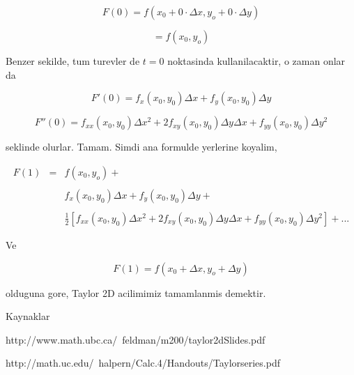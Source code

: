 \documentclass[12pt,fleqn]{article}\usepackage{../common}
\begin{document}
\[ F(0) = f(x_0 + 0 \cdot \Delta x, y_o + 0 \cdot \Delta y) \]

\[ = f(x_0 , y_o) \]

Benzer sekilde, tum turevler de $t=0$ noktasinda kullanilacaktir, o zaman
onlar da

\[ F'(0) = f_x(x_0,y_0) \Delta x + f_y(x_0,y_0) \Delta y \]

\[ F''(0) =  
f_{xx}(x_0,y_0)\Delta x^2 + 2f_{xy}(x_0,y_0)\Delta y \Delta x + 
f_{yy}(x_0,y_0)\Delta y^2 
\]

seklinde olurlar. Tamam. Simdi ana formulde yerlerine koyalim,

\[ 
\begin{array}{lll}
F(1) &=& f(x_0 , y_o) +  \\ \\ 
&& f_x(x_0,y_0) \Delta x + f_y(x_0,y_0) \Delta y +   \\ \\
&& \frac{1}{2} 
[ 
f_{xx}(x_0,y_0)\Delta x^2 + 
2f_{xy}(x_0,y_0)\Delta y \Delta x +
f_{yy}(x_0,y_0)\Delta y^2 
] + ... 
\end{array}
 \]


Ve

\[ F(1) = f(x_0 +\Delta x, y_o + \Delta y) \]

olduguna gore, Taylor 2D acilimimiz tamamlanmis demektir. 

Kaynaklar 

http://www.math.ubc.ca/~feldman/m200/taylor2dSlides.pdf

http://math.uc.edu/~halpern/Calc.4/Handouts/Taylorseries.pdf
\end{document}
